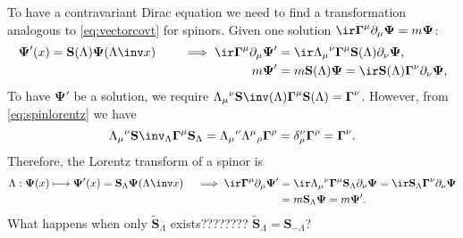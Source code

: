 \documentclass[11pt]{article}
\newcommand{\Gammab}{\boldsymbol{\Gamma}}
\renewcommand{\S}{\mathbf{S}}
\newcommand{\St}{\widetilde{\S}}
\newcommand{\Psib}{\boldsymbol{\Psi}}
\begin{document}
To have a contravariant Dirac equation we need to find a transformation analogous to \cref{eq:vectorcovt} for spinors.
Given one solution \(\ir \Gammab^\mu \partial_\mu \Psib = m \Psib\):
%
\begin{equation*}
\begin{aligned}
  \Psib'(x) = \S(\Lambda) \Psib(\Lambda\inv x)
  \qquad\implies
  \ir \Gammab^\mu \partial_\mu \Psib'
    &= \ir \Lambda_\mu{}^\nu \Gammab^\mu \S(\Lambda) \partial_\nu \Psib, \\
  m \Psib' &= m \S(\Lambda) \Psib
    = \ir \S(\Lambda) \Gammab^\nu \partial_\nu \Psib,
\end{aligned}
\end{equation*}
%
To have \(\Psib'\) be a solution, we require \(\Lambda_\mu{}^\nu \S\inv(\Lambda) \Gammab^\mu \S(\Lambda) = \Gammab^\nu\).
However, from \cref{eq:spinlorentz} we have
%
\begin{equation*}
  \Lambda_\mu{}^\nu \S\inv_\Lambda \Gammab^\mu \S_\Lambda 
    = \Lambda_\mu{}^\nu \Lambda^\mu{}_\rho \Gammab^\rho
    = \delta^\nu_\rho \Gammab^\rho 
    = \Gammab^\nu.
\end{equation*}
%
Therefore, the Lorentz transform of a spinor is
%
\begin{equation}\label{eq:diraccovt}
\begin{aligned}
  \Lambda: \Psib(x) \longmapsto \Psib'(x) = \S_\Lambda \Psib(\Lambda\inv x)
  \quad \implies
  \ir \Gammab^\mu \partial_\mu \Psib'
    &= \ir \Lambda_\mu{}^\nu \Gammab^\mu \S_\Lambda \partial_\nu \Psib
    = \ir \S_\Lambda \Gammab^\nu \partial_\nu \Psib \\
    &= m \S_\Lambda \Psib
    = m \Psib'.
\end{aligned}
\end{equation}
%
What happens when only \(\St_\Lambda\) exists???????? \(\St_\Lambda = \S_{-\Lambda}\)?
\end{document}
